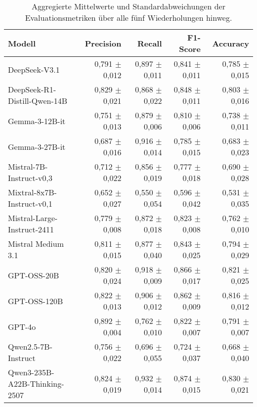 \begin{table}[htbp]
    \centering
    \caption{Aggregierte Mittelwerte und Standardabweichungen der Evaluationsmetriken über alle fünf Wiederholungen hinweg.}
    \label{tab:metrics-overview}
    \begin{adjustbox}{width=\textwidth}
        \begin{tabular}{l r r r r}
            \toprule
            Modell                          & Precision         & Recall            & F1-Score          & Accuracy \\
            \midrule
            DeepSeek-V3.1                   & 0,791 $\pm$ 0,012 & 0,897 $\pm$ 0,011 & 0,841 $\pm$ 0,011 & 0,785 $\pm$ 0,015 \\
            DeepSeek-R1-Distill-Qwen-14B    & 0,829 $\pm$ 0,021 & 0,868 $\pm$ 0,022 & 0,848 $\pm$ 0,011 & 0,803 $\pm$ 0,016 \\
            Gemma-3-12B-it                  & 0,751 $\pm$ 0,013 & 0,879 $\pm$ 0,006 & 0,810 $\pm$ 0,006 & 0,738 $\pm$ 0,011 \\
            Gemma-3-27B-it                  & 0,687 $\pm$ 0,016 & 0,916 $\pm$ 0,014 & 0,785 $\pm$ 0,015 & 0,683 $\pm$ 0,023 \\
            Mistral-7B-Instruct-v0,3        & 0,712 $\pm$ 0,022 & 0,856 $\pm$ 0,019 & 0,777 $\pm$ 0,018 & 0,690 $\pm$ 0,028 \\
            Mixtral-8x7B-Instruct-v0,1      & 0,652 $\pm$ 0,027 & 0,550 $\pm$ 0,054 & 0,596 $\pm$ 0,042 & 0,531 $\pm$ 0,035 \\
            Mistral-Large-Instruct-2411     & 0,779 $\pm$ 0,008 & 0,872 $\pm$ 0,018 & 0,823 $\pm$ 0,008 & 0,762 $\pm$ 0,010 \\
            Mistral Medium 3.1              & 0,811 $\pm$ 0,015 & 0,877 $\pm$ 0,040 & 0,843 $\pm$ 0,025 & 0,794 $\pm$ 0,029 \\
            GPT-OSS-20B                     & 0,820 $\pm$ 0,024 & 0,918 $\pm$ 0,009 & 0,866 $\pm$ 0,017 & 0,821 $\pm$ 0,025 \\
            GPT-OSS-120B                    & 0,822 $\pm$ 0,013 & 0,906 $\pm$ 0,012 & 0,862 $\pm$ 0,009 & 0,816 $\pm$ 0,012 \\
            GPT-4o                          & 0,892 $\pm$ 0,004 & 0,762 $\pm$ 0,010 & 0,822 $\pm$ 0,007 & 0,791 $\pm$ 0,007 \\
            Qwen2.5-7B-Instruct             & 0,756 $\pm$ 0,022 & 0,696 $\pm$ 0,055 & 0,724 $\pm$ 0,037 & 0,668 $\pm$ 0,040 \\
            Qwen3-235B-A22B-Thinking-2507   & 0,824 $\pm$ 0,019 & 0,932 $\pm$ 0,014 & 0,874 $\pm$ 0,015 & 0,830 $\pm$ 0,021 \\
            \bottomrule
        \end{tabular}
    \end{adjustbox}
\end{table}

